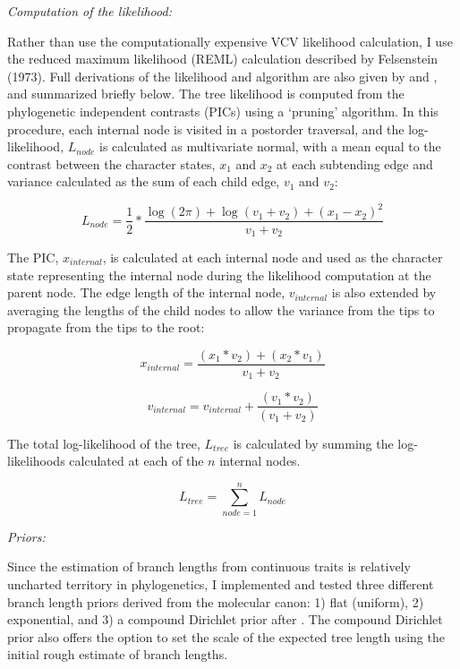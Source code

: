 \documentclass[12pt]{article}
\begin{document}
\noindent\emph{Computation of the likelihood:}

Rather than use the computationally expensive VCV likelihood
calculation, I use the reduced maximum likelihood (REML) calculation
described by Felsenstein (1973). Full derivations of the likelihood and algorithm are also given by \cite{felsenstein1981brownian} and \cite{freckleton2012fast}, and summarized briefly below. The tree likelihood is computed  from the phylogenetic independent contrasts (PICs) using a `pruning' algorithm. In this procedure, each internal node is visited in a postorder traversal, and the log- likelihood, $L_{node}$ is calculated  as multivariate normal, with a mean equal to the contrast between the character states, $x_1$ and $x_2$ at each subtending edge  and variance  calculated as the sum of each child edge, $v_1$ and $v_2$:

\begin{equation}
L_{node} = \frac{1}{2}*\frac{\log{(2\pi)}+\log{(v_1+v_2)}+(x_1-x_2)^2}{v_1+v_2}
\end{equation}

\noindent  The PIC, $x_{internal}$, is  calculated at each internal node and used as the character state representing the internal node during the likelihood computation at the parent node. The edge length of the internal node, $v_{internal}$ is also extended by averaging the lengths of the child nodes to allow the variance from the tips to propagate from the tips to the root:

\begin{equation}
x_{internal} = \frac{(x_1*v_2)+(x_2*v_1)}{v_1+v_2}
\end{equation}

\begin{equation}
v_{internal} = v_{internal} + \frac{(v_1*v_2)}{(v_1+v_2)}
\end{equation}

\noindent The total log-likelihood of the tree, $L_{tree}$ is calculated by summing the log-likelihoods calculated at each of the $n$ internal nodes.

\begin{equation}
L_{tree} = \sum\limits_{node=1}^{n} L_{node}
\end{equation} 

\noindent\emph{Priors:}

Since the estimation of branch lengths from continuous traits is
relatively uncharted territory in phylogenetics, I implemented and
tested three different branch length priors derived from the molecular
canon: 1) flat (uniform), 2) exponential, and 3) a compound Dirichlet
prior after  \citep{rannala2011tail}. The compound Dirichlet prior also
offers the option to set the scale of the expected tree length using the
initial rough estimate of branch lengths.
\end{document}
